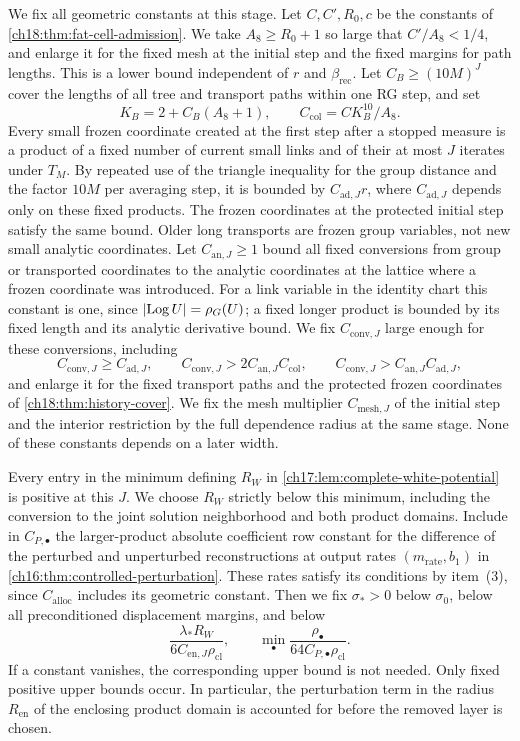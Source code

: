 We fix all geometric constants at this stage. Let $C,C',R_0,c$ be the constants of \cref{ch18:thm:fat-cell-admission}. We take $A_8\ge R_0+1$ so large that $C'/A_8<1/4$, and enlarge it for the fixed mesh at the initial step and the fixed margins for path lengths. This is a lower bound independent of $r$ and $\beta_{\mathrm{rec}}$. Let $C_B\ge(10M)^J$ cover the lengths of all tree and transport paths within one RG step, and set
\begin{equation}\label{ch20:eq:saving-constants}
 K_B=2+C_B(A_8+1),\qquad C_{\mathrm{col}}=CK_B^{10}/A_8.
\end{equation}
Every small frozen coordinate created at the first step after a stopped measure is a product of a fixed number of current small links and of their at most $J$ iterates under $T_M$. By repeated use of the triangle inequality for the group distance and the factor $10M$ per averaging step, it is bounded by $C_{\mathrm{ad},J}r$, where $C_{\mathrm{ad},J}$ depends only on these fixed products. The frozen coordinates at the protected initial step satisfy the same bound. Older long transports are frozen group variables, not new small analytic coordinates. Let $C_{\mathrm{an},J}\ge1$ bound all fixed conversions from group or transported coordinates to the analytic coordinates at the lattice where a frozen coordinate was introduced. For a link variable in the identity chart this constant is one, since $\lvert \operatorname{Log} U\rvert=\rho_G(U)$; a fixed longer product is bounded by its fixed length and its analytic derivative bound. We fix $C_{\mathrm{conv},J}$ large enough for these conversions, including
\[
 C_{\mathrm{conv},J}\ge C_{\mathrm{ad},J},\qquad C_{\mathrm{conv},J}>2C_{\mathrm{an},J}C_{\mathrm{col}},\qquad C_{\mathrm{conv},J}>C_{\mathrm{an},J}C_{\mathrm{ad},J},
\]
and enlarge it for the fixed transport paths and the protected frozen coordinates of \cref{ch18:thm:history-cover}. We fix the mesh multiplier $C_{\mathrm{mesh},J}$ of the initial step and the interior restriction by the full dependence radius at the same stage. None of these constants depends on a later width.

Every entry in the minimum defining $R_W$ in \cref{ch17:lem:complete-white-potential} is positive at this $J$. We choose $R_W$ strictly below this minimum, including the conversion to the joint solution neighborhood and both product domains. Include in $C_{P,\bullet}$ the larger-product absolute coefficient row constant for the difference of the perturbed and unperturbed reconstructions at output rates $(m_{\mathrm{rate}},b_1)$ in \cref{ch16:thm:controlled-perturbation}. These rates satisfy its conditions by item~(3), since $C_{\mathrm{alloc}}$ includes its geometric constant. Then we fix $\sigma_*>0$ below $\sigma_0$, below all preconditioned displacement margins, and below
\[
 \frac{\lambda_*R_W}{6C_{\mathrm{en},J}\rho_{\mathrm{cl}}},\qquad \min_\bullet\frac{\rho_\bullet}{64C_{P,\bullet}\rho_{\mathrm{cl}}}.
\]
If a constant vanishes, the corresponding upper bound is not needed. Only fixed positive upper bounds occur. In particular, the perturbation term in the radius $R_{\mathrm{en}}$ of the enclosing product domain is accounted for before the removed layer is chosen.

